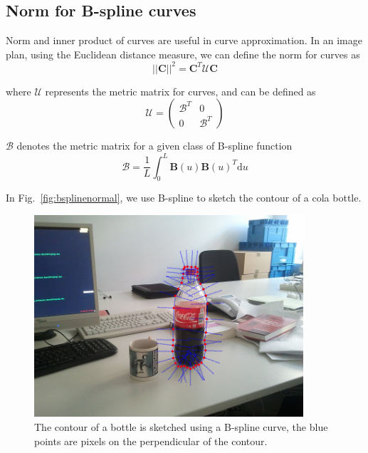 \subsection{Norm for B-spline curves}
\label{sec:nbc}

Norm and inner product of curves are useful in curve approximation. In
an image plan, using the Euclidean distance measure, we can define the
norm for curves as 
\begin{equation}
  \label{eq:4.13}
  \left| \left| \mathbf{C} \right|\right|^2  = \mathbf{C}^T\mathcal{U}\mathbf{C}
\end{equation}

where $\mathcal{U}$ represents the metric matrix for curves, and can be
defined as 
\begin{equation}
  \label{eq:4.14}
  \mathcal{U} =   \begin{pmatrix}
\mathcal{B}^T & 0 \\
0 &\mathcal{B}^T
  \end{pmatrix}  
\end{equation}

$\mathcal{B}$ denotes the metric matrix for a given class of B-spline
function
\begin{equation}
  \label{eq:4.15}
  \mathcal{B}   = \frac{1}{L} \int_0^L \mathbf{B}(u)\mathbf{B}(u)^T \mathrm{d}u
\end{equation}

In Fig.~\ref{fig:bsplinenormal}, we use B-spline to sketch the contour of a
cola bottle.
\begin{figure}[htb]
  \centering
  \includegraphics[width=10cm]{images/bsplinenormal.png}
  \caption{The contour of a bottle is sketched using a B-spline
    curve, the blue points are pixels on the perpendicular of the contour.}
\label{fig:bspline}
\end{figure}


